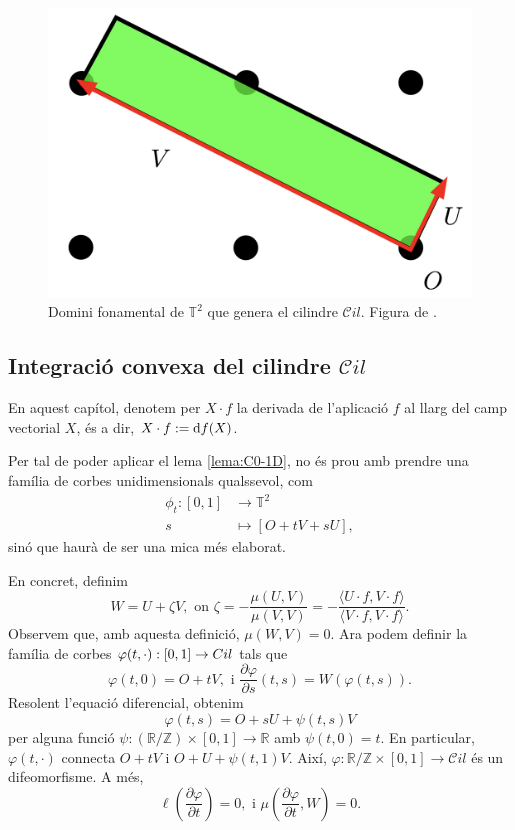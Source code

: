 \begin{figure}[htbp]
    \centering
    \includegraphics[height=0.3\textwidth]{domini.png}
    \caption{Domini fonamental de $\mathbb T^2$ que genera el cilindre $\mathcal Cil$. Figura de \cite{borrelli2013}.}
    \label{fig:setena_foto}
\end{figure}

\subsection{Integració convexa del cilindre $\mathcal Cil$}
\begin{nota}
    En aquest capítol, denotem per $X\cdot f$ la derivada de l'aplicació $f$ al llarg del camp vectorial $X$, és a dir, $X\cdot f := \text df(X)$.
\end{nota}
Per tal de poder aplicar el lema \ref{lema:C0-1D}, no és prou amb prendre una família de corbes unidimensionals qualssevol, com
\begin{align}
    \nonumber\phi_t:[0,1]&\to\mathbb T^2\\
    \nonumber s&\mapsto [O+tV+sU],
\end{align}
sinó que haurà de ser una mica més elaborat. 

En concret, definim 
\begin{equation*}
    W=U+\zeta V, \text{ on } \zeta = -\frac{\mu(U,V)}{\mu(V,V)} = -\frac{\langle U\cdot f, V\cdot f\rangle}{\langle V\cdot f, V\cdot f\rangle}.
\end{equation*}
Observem que, amb aquesta definició, $\mu(W,V)=0$. Ara podem definir la família de corbes $\varphi(t,\cdot):[0,1]\to\mathbb \mathcal Cil$ tals que 
\begin{equation*}
    \varphi(t,0) = O + tV, \text{ i } \frac{\partial\varphi}{\partial s}(t,s) = W(\varphi(t,s)).
\end{equation*}
Resolent l'equació diferencial, obtenim
\begin{equation*}
    \varphi(t,s) = O + sU + \psi(t,s)V
\end{equation*}
per alguna funció $\psi:(\mathbb R/\mathbb Z)\times[0,1]\to\mathbb R$ amb $\psi(t,0)=t$. En particular, $\varphi(t,\cdot)$ connecta $O+tV$ i $O+U+\psi(t,1)V$. Així, $\varphi:\mathbb R/\mathbb Z\times[0,1]\to\mathcal Cil$ és un difeomorfisme. A més, 
\begin{equation*}
    \ell\left( \frac{\partial\varphi}{\partial t} \right) = 0, \text{ i } \mu\left( \frac{\partial\varphi}{\partial t}, W \right) = 0.
\end{equation*}

